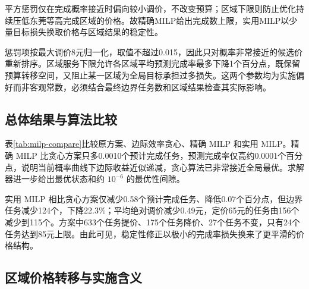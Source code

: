 ﻿\documentclass[UTF8,zihao=-4,a4paper,fontset=fandol]{ctexart}
\begin{document}
平方惩罚仅在完成概率接近时偏向较小调价，不改变预算；区域下限则防止优化持续压低东莞等高完成区域的价格。故精确MILP给出完成数上限，实用MILP以少量目标损失换取价格与区域结果的稳定性。

惩罚项按最大调价8元归一化，取值不超过0.015，因此只对概率非常接近的候选价重新排序。区域服务下限允许各区域平均预测完成率最多下降1个百分点，既保留预算转移空间，又阻止某一区域为全局目标承担过多损失。这两个参数均为实施偏好而非客观常数，必须结合最终边界任务数和区域结果检查其实际影响。

\subsection{总体结果与算法比较}

表\ref{tab:milp-compare}比较原方案、边际效率贪心、精确 MILP 和实用 MILP。精确 MILP 比贪心方案只多0.0010个预计完成任务，预测完成率仅高约0.0001个百分点，说明当前概率曲线下边际收益近似递减，贪心算法已非常接近全局最优。求解器进一步给出最优状态和约 $10^{-6}$ 的最优性间隙。

\begin{table}[H]
  \centering
  \caption{原方案与三种重新定价方案的总体结果}
  \label{tab:milp-compare}
\end{table}

实用 MILP 相比贪心方案仅减少0.58个预计完成任务、降低0.07个百分点，但边界任务减少124个，下降22.3\%；平均绝对调价减少0.49元，定价65元的任务由156个减少到115个。方案中633个任务提价、175个任务降价、27个任务不变，只有24个任务达到85元上限。由此可见，稳定性修正以极小的完成率损失换来了更平滑的价格结构。

\subsection{区域价格转移与实施含义}
\end{document}
